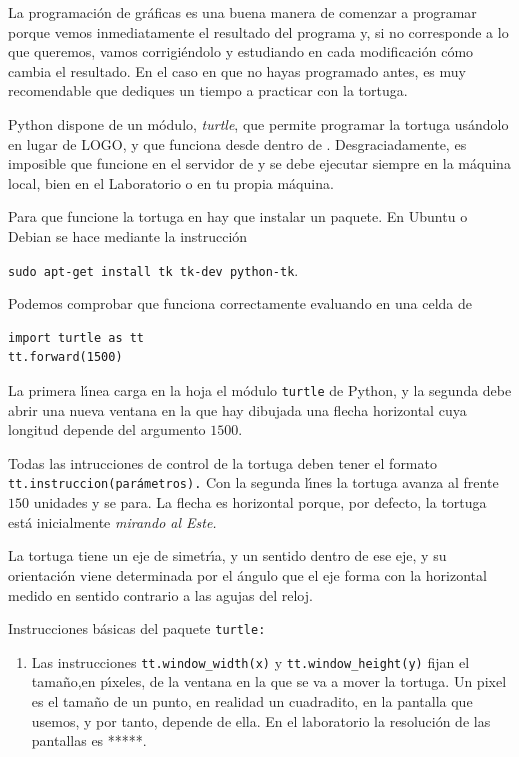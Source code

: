 \begin{appendices}
La programaci\'on de gr\'aficas es una buena manera de comenzar a programar
porque vemos inmediatamente el resultado del programa y, si no corresponde a lo
que queremos, vamos corrigi\'endolo y estudiando en cada modificaci\'on c\'omo
cambia el resultado. En el caso en que no hayas programado antes, es muy
recomendable que dediques un tiempo a practicar con la tortuga.


Python dispone de un m\'odulo, {\itshape turtle}, que permite programar la
tortuga us\'andolo en lugar de LOGO, y que funciona desde dentro de {\sage}.
Desgraciadamente, es imposible que funcione en el servidor de {\sage} y se debe
ejecutar siempre en la m\'aquina local, bien en el Laboratorio o en tu propia
m\'aquina.


Para que funcione la tortuga en {\sage} hay que instalar un paquete. En Ubuntu o
Debian se hace mediante la instrucci\'on  
\begin{center}
{\tt sudo apt-get install tk tk-dev python-tk}.
\end{center}
 Podemos comprobar que funciona correctamente evaluando en una celda de
{\sage}
 \begin{lstlisting}
import turtle as tt
tt.forward(1500)
 \end{lstlisting}

 La primera l\'{\i}nea carga en la hoja el m\'odulo {\tt turtle} de Python, y la
segunda debe abrir una nueva ventana en la que hay dibujada una flecha
horizontal cuya longitud depende del argumento $1500$.

Todas las intrucciones de control de la tortuga deben tener el formato {\tt
tt.instruccion(par\'ametros).} Con la segunda l\'{\i}nes la tortuga avanza al
frente $150$ unidades y se para. La flecha es horizontal porque, por defecto,
la tortuga  est\'a inicialmente {\itshape mirando al Este.}

La tortuga tiene un eje de simetr\'{\i}a, y un sentido dentro de ese eje,  y su
orientaci\'on viene determinada por el \'angulo que el eje forma con la
horizontal medido en sentido contrario a las agujas del reloj. 




{\sc Instrucciones b\'asicas  del paquete {\tt turtle:}}

\begin{enumerate}
 \item  Las instrucciones \lstinline|tt.window_width(x)| y 
\lstinline|tt.window_height(y)| fijan el tama\~no,en p\'{\i}xeles,   de la
ventana en la que se va a mover la tortuga. 
Un pixel es el tama\~no de un punto, en realidad un cuadradito,  en la pantalla
que usemos, y por tanto, depende de ella. En el laboratorio la resoluci\'on de
las pantallas es *****. 


\end{enumerate}
\end{appendices}
